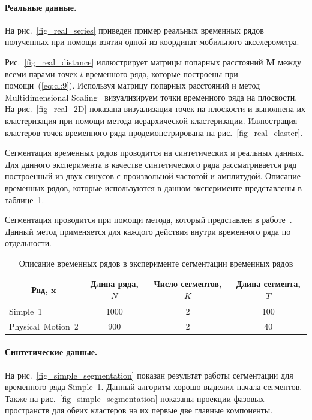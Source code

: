 \paragraph{Реальные данные.}

На рис.~\ref{fig_real_series} приведен пример реальных временных рядов полученных при помощи взятия одной из координат мобильного акселерометра. 

Рис.~\ref{fig_real_distance} иллюстрирует матрицы попарных расстояний $\textbf{M}$ между всеми парами точек $t$ временного ряда, которые построены при помощи~(\ref{eq:cl:9}). 
Используя матрицу попарных расстояний и метод Multidimensional Scaling~\cite{Borg2005} визуализируем точки временного ряда на плоскости. 
На рис.~\ref{fig_real_2D} показана визуализация точек на плоскости и выполнена их кластеризация при помощи метода иерархической кластеризации. 
Иллюстрация кластеров точек временного ряда продемонстрирована на рис.~\ref{fig_real_claster}.

Сегментация временных рядов проводится на синтетических и реальных данных. Для данного эксперимента в качестве синтетического ряда рассматривается ряд построенный из двух синусов с произвольной частотой и амплитудой. Описание временных рядов, которые используются в данном эксперименте представлены в таблице~\ref{table:3}.

Сегментация проводится при помощи метода, который представлен в работе~\cite{motrenko2015}. Данный метод применяется для каждого действия внутри временного ряда по отдельности.


\begin{table}[h!t]
\begin{center}
\caption{Описание временных рядов в эксперименте сегментации временных рядов}
\label{table:3}
\begin{tabular}{|c|c|c|c|}
\hline
	Ряд, $\textbf{x}$ &Длина ряда, $N$& Число сегментов, $K$&Длина сегмента, $T$\\
	\hline
	\multicolumn{1}{|l|}{Simple~1}
	& 1000& 2& 100\\
	\hline
	\multicolumn{1}{|l|}{Physical~Motion~2}
	& 900& 2& 40\\
\hline

\end{tabular}
\end{center}
\end{table}

\paragraph{Синтетические данные.} На рис.~\ref{fig_simple_segmentation} показан результат работы сегментации для временного ряда Simple~1. 
Данный алгоритм хорошо выделил начала сегментов. 
Также на рис.~\ref{fig_simple_segmentation} показаны проекции фазовых пространств для обеих кластеров на их первые две главные компоненты.

